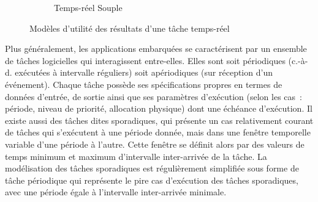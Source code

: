 \documentclass[french, a4paper, 11pt, twoside, pdftex]{StyleThese}
\begin{document}
\begin{figure}[h!]
\begin{subfigure}{.3\textwidth}
				\caption[]{Temps-réel Souple}
				\label{fig:tempReelMou}
			\end{subfigure}
			\caption{Modèles d'utilité des résultats d'une tâche temps-réel}
			\label{fig:ModelesTempsReel}
		\end{figure}
		
		Plus généralement, les applications embarquées se caractérisent par un ensemble de tâches logicielles qui interagissent entre-elles. Elles sont soit périodiques (c.-à-d. exécutées à intervalle réguliers) soit apériodiques (sur réception d'un événement). Chaque tâche possède ses spécifications propres en termes de données d'entrée, de sortie ainsi que ses paramètres d'exécution (selon les cas : période, niveau de priorité, allocation physique) dont une échéance d'exécution. Il existe aussi des tâches dites sporadiques, qui présente un cas relativement courant de tâches qui s'exécutent à une période donnée, mais dans une fenêtre temporelle variable d'une période à l'autre. Cette fenêtre se définit alors par des valeurs de temps minimum et maximum d'intervalle inter-arrivée de la tâche. La modélisation des tâches sporadiques est régulièrement simplifiée sous forme de tâche périodique qui représente le pire cas d'exécution des tâches sporadiques, avec une période égale à l'intervalle inter-arrivée minimale.
		
\end{document}
